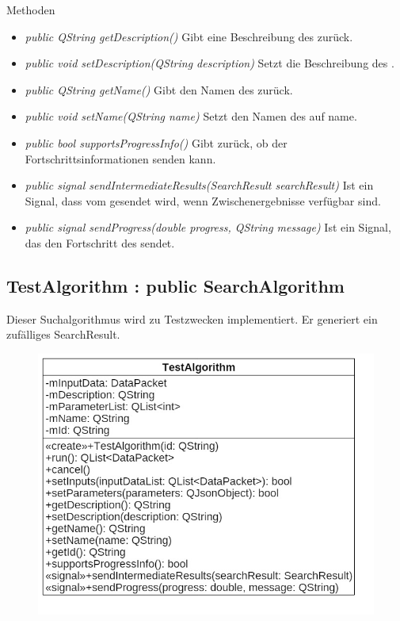 Methoden
\begin{itemize}
\item\textit{public QString getDescription()} Gibt eine Beschreibung des  zurück.
\item\textit{public void setDescription(QString description)} Setzt die Beschreibung des .
\item\textit{public QString getName()} Gibt den Namen des  zurück.
\item\textit{public void setName(QString name)} Setzt den Namen des  auf name.
\item\textit{public bool supportsProgressInfo()} Gibt zurück, ob der  Fortschrittsinformationen senden kann.
\item\textit{public signal sendIntermediateResults(SearchResult searchResult)} Ist ein Signal, dass vom  gesendet wird, wenn Zwischenergebnisse verfügbar sind.
\item\textit{public signal sendProgress(double progress, QString message)} Ist ein Signal, das den Fortschritt des  sendet.
\end{itemize}

\pagebreak

\subsection*{TestAlgorithm : public SearchAlgorithm}
Dieser \gls{Suchalgorithmus} wird zu Testzwecken implementiert. Er generiert ein zufälliges SearchResult.

\begin{figure}[H]
\centering
\includegraphics[scale=0.5]{img/Klassendiagramm/Klassen/Model/TestAlgorithm}
\label{fig:testAlgorithm}
\end{figure}

